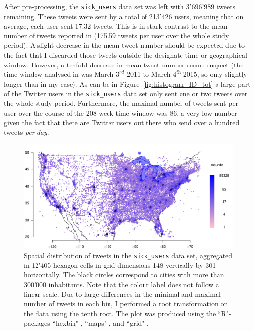 \documentclass[11pt, a4paper,twoside]{report}\usepackage[]{graphicx}\usepackage[]{color}
\begin{document}
After pre-processing, the \texttt{sick\_users} data set was left with 3'696'989 tweets remaining. These tweets were sent by a total of 213'426 users, meaning that on average, each user sent 17.32 tweets. This is in stark contrast to the mean number of tweets reported in \cite{bodnar_data_2015} (175.59 tweets per user over the whole study period). A slight decrease in the mean tweet number should be expected due to the fact that I discarded those tweets outside the designate time or geographical window. However, a tenfold decrease in mean tweet number seems suspect (the time window analysed in \cite{bodnar_data_2015} was March $3^\textit{rd}$ 2011 to March $4^\textit{th}$ 2015, so only slightly longer than in my case). As can be in Figure~\ref{fig:histogram_ID_tot} a large part of the Twitter users in the \texttt{sick\_users} data set only sent one or two tweets over the whole study period. Furthermore, the maximal number of tweets sent per user over the course of the 208 week time window was 86, a very low number given the fact that there are Twitter users out there who send over a hundred tweets \textit{per day}.

\begin{figure}[htbp!]
  \centering
    \includegraphics[width=1\textwidth]{4A_HexbinContinent.pdf}
  \caption{Spatial distribution of tweets in the \texttt{sick\_users} data set, aggregated in 12'405 hexagon cells in grid dimensions 148 vertically by 301 horizontally. The black circles correspond to cities with more than 300'000 inhabitants. Note that the colour label does not follow a linear scale. Due to large differences in the minimal and maximal number of tweets in each bin, I performed a root transformation on the data using the tenth root. The plot was produced using the ``R"-packages ``hexbin" \citep{hexbin_2016}, ``maps" \citep{maps_2016}, and ``grid" \citep{murrell_integrating_2003,murrell_grid_2007,zhou_fun_2010}.}
  \label{fig:hexbincontinent}
  \end{figure}
\end{document}
